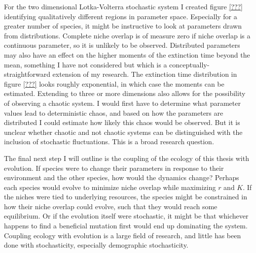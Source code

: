 For the two dimensional Lotka-Volterra stochastic system I created figure \ref{???} identifying qualitatively different regions in parameter space. 
Especially for a greater number of species, it might be instructive to look at parameters drawn from distributions. 
Complete niche overlap is of measure zero if niche overlap is a continuous parameter, so it is unlikely to be observed. 
Distributed parameters may also have an effect on the higher moments of the extinction time beyond the mean, something I have not considered but which is a conceptually-straightforward extension of my research. 
The extinction time distribution in figure \ref{???} looks roughly exponential, in which case the moments can be estimated. 
Extending to three or more dimensions also allows for the possibility of observing a chaotic system. 
I would first have to determine what parameter values lead to deterministic chaos, and based on how the parameters are distributed I could estimate how likely this chaos would be observed.
But it is unclear whether chaotic and not chaotic systems can be distinguished with the inclusion of stochastic fluctuations. 
This is a broad research question. 

The final next step I will outline is the coupling of the ecology of this thesis with evolution. 
If species were to change their parameters in response to their environment and the other species, how would the dynamics change? 
Perhaps each species would evolve to minimize niche overlap while maximizing $r$ and $K$. 
If the niches were tied to underlying resources, the species might be constrained in how their niche overlap could evolve, such that they would reach some equilibrium. 
Or if the evolution itself were stochastic, it might be that whichever happens to find a beneficial mutation first would end up dominating the system. 
Coupling ecology with evolution is a large field of research, and little has been done with stochasticity, especially demographic stochasticity. 


